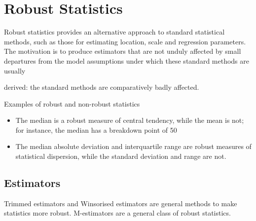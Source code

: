

\section*{Robust Statistics}

Robust statistics provides an alternative approach to standard statistical methods, 
such as those for estimating location, scale and regression parameters. 
The motivation is to produce estimators that are not unduly affected by small departures 
from the model assumptions under which these standard methods are usually 

derived: the standard methods are comparatively badly affected.

Examples of robust and non-robust statistics

\begin{itemize}
\item The median is a robust measure of central tendency, while the mean is not; for instance, the median has a breakdown point of 50%
\item The median absolute deviation and interquartile range are robust measures of statistical dispersion, while the standard deviation and range are not.
\end{itemize}

\subsection*{Estimators}
Trimmed estimators and Winsorised estimators are general methods to make statistics more robust. M-estimators are a general class of robust statistics.






